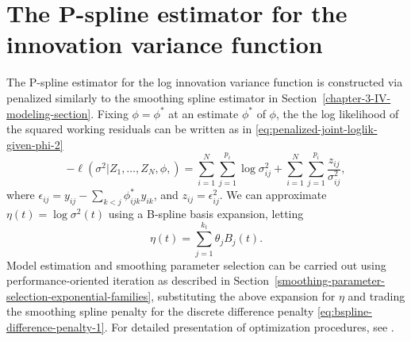 \section{The P-spline estimator for the innovation variance function}

The P-spline estimator for the log innovation variance function is constructed via penalized similarly to the smoothing spline estimator in Section~\ref{chapter-3-IV-modeling-section}.  Fixing $\phi = \phi^*$ at an estimate $\phi^*$ of $\phi$, the the log likelihood of the squared working residuals can be written as in \eqref{eq:penalized-joint-loglik-given-phi-2}
\[
-\ell\left( \sigma^2  \vert Z_1,\dots, Z_N, \phi,  \right) =  \sum_{i = 1}^N \sum_{j = 1}^{p_i} \log \sigma^2_{ij}  + \sum_{i = 1}^N \sum_{j = 1}^{p_i} \frac {z_{ij}}{\sigma^2_{ij}},
\]
\noindent
where $\epsilon_{ij} =  y_{ij} - \sum\limits_{k<j} \phi^*_{ijk} y_{ik}$, and $z_{ij} = \epsilon_{ij}^2$. We can approximate $\eta \left(t\right) = \log \sigma^2\left(t\right)$ using a B-spline basis expansion, letting
\[
\eta\left(t\right) = \sum\limits_{j = 1}^{k_t} \theta_j B_{j}\left(t\right).
\] 
\noindent
Model estimation and smoothing parameter selection can be carried out using performance-oriented iteration as described in Section~\ref{smoothing-parameter-selection-exponential-families}, substituting the above expansion for $\eta$ and trading the smoothing spline penalty for the discrete difference penalty \eqref{eq:bspline-difference-penalty-1}. For detailed presentation of optimization procedures, see \cite{marx1999generalized}. 


